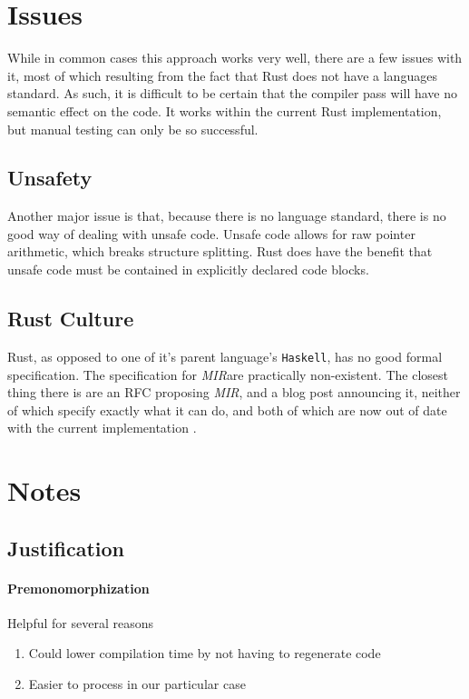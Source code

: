 \documentclass[12pt,final]{article}
\newcommand{\mirname}{{\small \em MIR}}
\def\mir{\mirname}
\begin{document}
\section{Issues}

While in common cases this approach works very well, there are a few issues with
it, most of which resulting from the fact that Rust does not have a languages
standard. As such, it is difficult to be certain that the compiler pass will
have no semantic effect on the code. It works within the current Rust
implementation, but manual testing can only be so successful.

\subsection{Unsafety}
\label{sec:unsafe}


Another major issue is that, because there is no language standard, there is no
good way of dealing with unsafe code. Unsafe code allows for raw pointer
arithmetic, which breaks structure splitting. Rust does have the benefit that
unsafe code must be contained in explicitly declared code blocks.

\subsection{Rust Culture}
\label{sec:culture}

Rust, as opposed to one of it's parent language's \texttt{Haskell}, has no good
formal specification. The specification for \mir are practically non-existent. %
The closest thing there is are an RFC proposing \mir, and a blog post announcing
it, neither of which specify exactly what it can do, and both of which are now
out of date with the current implementation .

\section{Notes}
\label{sec:remove}

\subsection{Justification}
\label{sec:just}

\paragraph{Premonomorphization} Helpful for several reasons
\begin{enumerate}
\item Could lower compilation time by not having to regenerate code
\item  Easier to process in our particular case
\end{enumerate}
\end{document}
